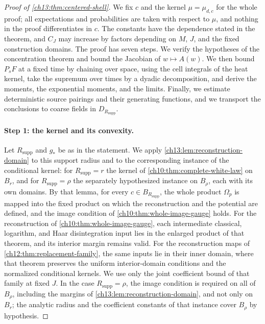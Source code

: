 \begin{proof}[Proof of \cref{ch13:thm:centered-shell}]
We fix $c$ and the kernel $\mu=\mu_{d,c}$ for the whole proof; all expectations and probabilities are taken with respect to $\mu$, and nothing in the proof differentiates in $c$. The constants have the dependence stated in the theorem, and $C_J$ may increase by factors depending on $M$, $J$, and the fixed construction domains. The proof has seven steps. We verify the hypotheses of the concentration theorem and bound the Jacobian of $w\mapsto A(w)$. We then bound $P_sF$ at a fixed time by chaining over space, using the cell integrals of the heat kernel, take the supremum over times by a dyadic decomposition, and derive the moments, the exponential moments, and the limits. Finally, we estimate deterministic source pairings and their generating functions, and we transport the conclusions to coarse fields in $D_{R_{\mathrm{supp}}}$.

\paragraph{Step 1: the kernel and its convexity.}
Let $R_{\mathrm{supp}}$ and $g_*$ be as in the statement. We apply \cref{ch13:lem:reconstruction-domain} to this support radius and to the corresponding instance of the conditional kernel: for $R_{\mathrm{supp}}=r$ the kernel of \cref{ch10:thm:complete-white-law} on $B_r$, and for $R_{\mathrm{supp}}=\rho$ the separately hypothesized instance on $B_\rho$, each with its own domains. By that lemma, for every $c\in B_{R_{\mathrm{supp}}}$, the whole product $\Omega_p$ is mapped into the fixed product on which the reconstruction and the potential are defined, and the image condition of \cref{ch10:thm:whole-image-gauge} holds. For the reconstruction of \cref{ch10:thm:whole-image-gauge}, each intermediate classical, logarithm, and Haar disintegration input lies in the enlarged product of that theorem, and its interior margin remains valid. For the reconstruction maps of \cref{ch12:thm:replacement-family}, the same inputs lie in their inner domain, where that theorem preserves the uniform interior-domain conditions and the normalized conditional kernels. We use only the joint coefficient bound of that family at fixed $J$. In the case $R_{\mathrm{supp}}=\rho$, the image condition is required on all of $B_\rho$, including the margins of \cref{ch13:lem:reconstruction-domain}, and not only on $B_r$; the analytic radius and the coefficient constants of that instance cover $B_\rho$ by hypothesis.


\end{proof}
